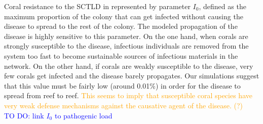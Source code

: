 \documentclass[utf8]{frontiersSCNS}
\begin{document}
Coral resistance to the SCTLD in represented by parameter $I_0$, defined as the maximum proportion of the colony that can get infected without causing the disease to spread to the rest of the colony. The modeled propagation of the disease is highly sensitive to this parameter. On the one hand, when corals are strongly susceptible to the disease, infectious individuals are removed from the system too fast to become sustainable sources of infectious materials in the network. On the other hand, if corals are weakly susceptible to the disease, very few corals get infected and the disease barely propagates. Our simulations suggest that this value must be fairly low (around 0.01\%) in order for the disease to spread from reef to reef. \textcolor{orange}{This seems to imply that susceptible coral species have very weak defense mechanisms against the causative agent of the disease. (?)} \\
\textcolor{blue}{TO DO: link $I_0$ to pathogenic load}



\end{document}
